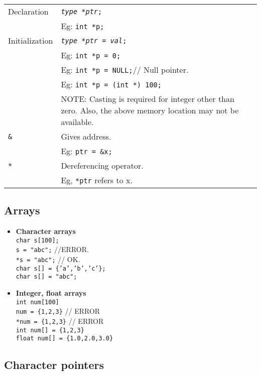 \begin{multicols*}{3}
\begin{tabularx}{\linewidth}{l|X}
\hline
Declaration & \texttt{\textit{type} *\textit{ptr};}\\
& Eg: \texttt{int *p;}\\
\hline
Initialization & \texttt{\textit{type *ptr = val};}\\
& Eg: \texttt{int *p = 0;}\\
& Eg: \texttt{int *p = NULL;}// Null pointer.\\
& Eg: \texttt{int *p = (int *) 100;}\\
& NOTE: Casting is required for integer other than zero. Also, the above memory location may not be available.\\
\hline
\texttt{\&} & Gives address.\\
& Eg: \texttt{ptr = \&x;}\\
\hline
\texttt{*} & Dereferencing operator.\\
& Eg, \texttt{*ptr} refers to x.\\
\hline
\end{tabularx}

\subsection{Arrays}

\begin{itemize}
\item \textbf{Character arrays}\\
\texttt{char s[100];}\\
\texttt{s = "abc";} //ERROR.\\
\texttt{*s = "abc";} // OK.\\
\texttt{char s[] = \{'a','b','c'\};}\\
\texttt{char s[] = "abc";}\\
\item \textbf{Integer, float arrays}\\
\texttt{int num[100]}\\
\texttt{num = \{1,2,3\}} // ERROR\\
\texttt{*num = \{1,2,3\}} // ERROR \\
\texttt{int num[] = \{1,2,3\}}\\
\texttt{float num[] = \{1.0,2.0,3.0\}}\\
\end{itemize}

\subsection{Character pointers}


\end{multicols*}

